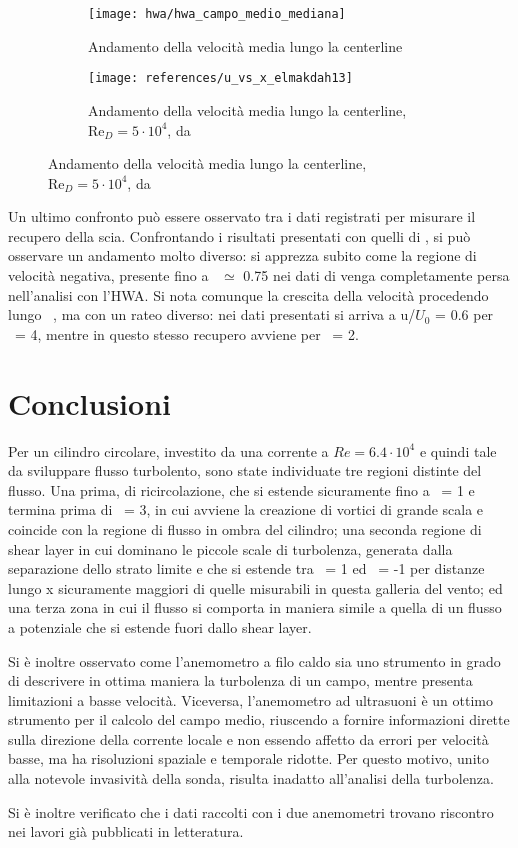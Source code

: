 \documentclass{article} %
\newcommand{\xd}{\nicefrac{\textrm{x}}{\textrm{D}}\ }
\newcommand{\yd}{\nicefrac{\textrm{y}}{\textrm{D}}\ }
\begin{document}
\begin{figure}[ht!]
	\begin{subfigure}{0.5\textwidth}
		\texttt{[image: hwa/hwa\_campo\_medio\_mediana]}
		\caption{Andamento della velocità media lungo la centerline}
	\end{subfigure}
	\quad
	\begin{subfigure}{0.5\textwidth}
		\texttt{[image: references/u\_vs\_x\_elmakdah13]}
		\caption{Andamento della velocità media lungo la centerline,\\Re$_D = 5\cdot 10^4$, da \cite[fig. 3a]{elmakdah13}}
	\end{subfigure}
\end{figure}\par
Un ultimo confronto può essere osservato tra i dati registrati per misurare il recupero della scia. Confrontando i risultati presentati con quelli di \cite{elmakdah13}, si può osservare un andamento molto diverso: si apprezza subito come la regione di velocità negativa, presente fino a \xd $\simeq$ 0.75 nei dati di \cite{elmakdah13} venga completamente persa nell'analisi con l'HWA. Si nota comunque la crescita della velocità procedendo lungo \xd, ma con un rateo diverso: nei dati presentati si arriva a u/$U_0$ = 0.6 per \xd = 4, mentre in \cite{elmakdah13} questo stesso recupero avviene per \xd = 2.
\section{Conclusioni}
Per un cilindro circolare, investito da una corrente a $Re = 6.4\cdot10^4$ e quindi tale da sviluppare flusso turbolento, sono state individuate tre regioni distinte del flusso. Una prima, di ricircolazione, che si estende sicuramente fino a \xd = 1 e termina prima di \xd = 3, in cui avviene la creazione di vortici di grande scala e coincide con la regione di flusso in ombra del cilindro; una seconda regione di shear layer in cui dominano le piccole scale di turbolenza, generata dalla separazione dello strato limite e che si estende tra \yd = 1 ed \yd = -1 per distanze lungo x sicuramente maggiori di quelle misurabili in questa galleria del vento; ed una terza zona in cui il flusso si comporta in maniera simile a quella di un flusso a potenziale che si estende fuori dallo shear layer.\par
Si è inoltre osservato come l'anemometro a filo caldo sia uno strumento in grado di descrivere in ottima maniera la turbolenza di un campo, mentre presenta limitazioni a basse velocità. Viceversa, l'anemometro ad ultrasuoni è un ottimo strumento per il calcolo del campo medio, riuscendo a fornire informazioni dirette sulla direzione della corrente locale e non essendo affetto da errori per velocità basse, ma ha risoluzioni spaziale e temporale ridotte. Per questo motivo, unito alla notevole invasività della sonda, risulta inadatto all'analisi della turbolenza.\par
Si è inoltre verificato che i dati raccolti con i due anemometri trovano riscontro nei lavori già 
pubblicati in letteratura.


\end{document}
